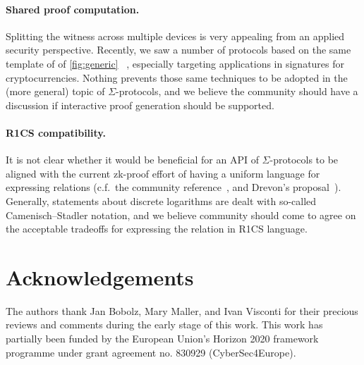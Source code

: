 \documentclass[runningheads]{llncs}
\newif\ifanonymous
\begin{document}
\paragraph{Shared proof computation.} Splitting the witness across multiple devices is very appealing from an applied security perspective.
Recently, we saw a number of protocols based on the same template of of \cref{fig:generic} ~\cite{EPRINT:KomGol20,EPRINT:NicRufSeu20}, especially targeting applications in signatures for cryptocurrencies.
Nothing prevents those same techniques to be adopted in the (more general) topic of $\Sigma$-protocols, and we believe the community should have a discussion if interactive proof generation should be supported.
\paragraph{R1CS compatibility.} It is not clear whether it would be beneficial for an API of $\Sigma$-protocols to be aligned with the current zk-proof effort of having a uniform
language for expressing relations (c.f.\ the community reference~\cite[section 3]{zkproof-reference}, and Drevon's proposal~\cite{jr1cs}).
Generally, statements about discrete logarithms are dealt with so-called Camenisch--Stadler notation, and we believe community should come to agree on the acceptable tradeoffs for expressing the relation in R1CS language.

\ifanonymous\else
\section*{Acknowledgements}
The authors thank Jan Bobolz, Mary Maller, and Ivan Visconti for their precious reviews and comments during the early stage of this work.
This work has partially been funded by the European Union's Horizon 2020 framework programme under grant agreement no. 830929 (CyberSec4Europe).
\fi


%
\end{document}

